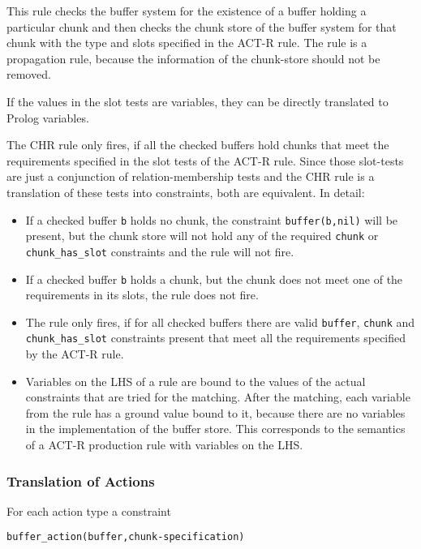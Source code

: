 This rule checks the buffer system for the existence of a buffer holding a particular chunk and then checks the chunk store of the buffer system for that chunk with the type and slots specified in the ACT-R rule. The rule is a propagation rule, because the information of the chunk-store should not be removed.

If the values in the slot tests are variables, they can be directly translated to Prolog variables.

The CHR rule only fires, if all the checked buffers hold chunks that meet the requirements specified in the slot tests of the ACT-R rule. Since those slot-tests are just a conjunction of relation-membership tests and the CHR rule is a translation of these tests into constraints, both are equivalent. In detail: 

\begin{itemize}
 \item If a checked buffer \verb|b| holds no chunk, the constraint \verb|buffer(b,nil)| will be present, but the chunk store will not hold any of the required \verb|chunk| or \verb|chunk_has_slot| constraints and the rule will not fire.
 \item If a checked buffer \verb|b| holds a chunk, but the chunk does not meet one of the requirements in its slots, the rule does not fire.
 \item The rule only fires, if for all checked buffers there are valid \verb|buffer|, \verb|chunk| and \verb|chunk_has_slot| constraints present that meet all the requirements specified by the ACT-R rule.
 \item Variables on the LHS of a rule are bound to the values of the actual constraints that are tried for the matching. After the matching, each variable from the rule has a ground value bound to it, because there are no variables in the implementation of the buffer store. This corresponds to the semantics of a ACT-R production rule with variables on the LHS.
\end{itemize}


\subsubsection{Translation of Actions}
\label{translation_of_actions}

For each action type a constraint

\begin{lstlisting}
buffer_action(buffer,chunk-specification)
\end{lstlisting}

